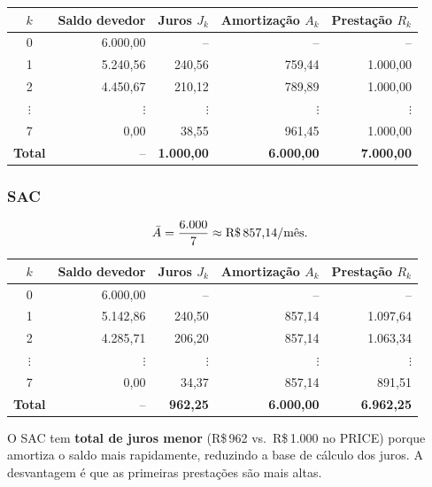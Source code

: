 \begin{center}
\renewcommand{\arraystretch}{1.3}
\begin{tabular}{crrrr}
\toprule
$k$ & Saldo devedor & Juros $J_k$ & Amortização $A_k$ & Prestação $R_k$ \\
\midrule
0 & 6.000,00 &     --    &      --    &        -- \\
1 & 5.240,56 & 240,56 & 759,44 & 1.000,00 \\
2 & 4.450,67 & 210,12 & 789,89 & 1.000,00 \\
$\vdots$ & $\vdots$ & $\vdots$ & $\vdots$ & $\vdots$ \\
7 &     0,00 &  38,55 & 961,45 & 1.000,00 \\
\midrule
\textbf{Total} & -- & \textbf{1.000,00} & \textbf{6.000,00} & \textbf{7.000,00} \\
\bottomrule
\end{tabular}
\end{center}

\subsubsection*{SAC}

\[
  \bar{A} = \frac{6{.}000}{7} \approx \text{R\$\,857{,}14/mês.}
\]

\begin{center}
\renewcommand{\arraystretch}{1.3}
\begin{tabular}{crrrr}
\toprule
$k$ & Saldo devedor & Juros $J_k$ & Amortização $A_k$ & Prestação $R_k$ \\
\midrule
0 & 6.000,00 &     --    &    --    &        -- \\
1 & 5.142,86 & 240,50 & 857,14 & 1.097,64 \\
2 & 4.285,71 & 206,20 & 857,14 & 1.063,34 \\
$\vdots$ & $\vdots$ & $\vdots$ & $\vdots$ & $\vdots$ \\
7 &     0,00 &  34,37 & 857,14 & 891,51 \\
\midrule
\textbf{Total} & -- & \textbf{962,25} & \textbf{6.000,00} & \textbf{6.962,25} \\
\bottomrule
\end{tabular}
\end{center}

\begin{nota}
O SAC tem \textbf{total de juros menor} (R\$\,962 vs.\ R\$\,1.000 no PRICE) porque amortiza o saldo
mais rapidamente, reduzindo a base de cálculo dos juros. A desvantagem é que as primeiras
prestações são mais altas.
\end{nota}

